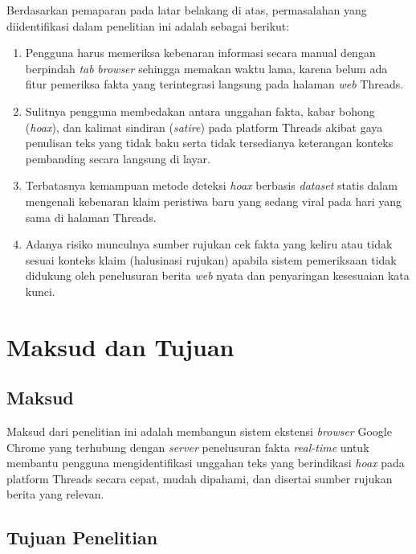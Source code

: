 \documentclass[12pt,a4paper,twoside]{report}
\begin{document}
Berdasarkan pemaparan pada latar belakang di atas, permasalahan yang diidentifikasi dalam penelitian ini adalah sebagai berikut:
\begin{enumerate}[leftmargin=0.8cm,itemsep=3pt,topsep=2pt]
  \item Pengguna harus memeriksa kebenaran informasi secara manual dengan berpindah \textit{tab} \textit{browser} sehingga memakan waktu lama, karena belum ada fitur pemeriksa fakta yang terintegrasi langsung pada halaman \textit{web} Threads.
  \item Sulitnya pengguna membedakan antara unggahan fakta, kabar bohong (\textit{hoax}), dan kalimat sindiran (\textit{satire}) pada platform Threads akibat gaya penulisan teks yang tidak baku serta tidak tersedianya keterangan konteks pembanding secara langsung di layar.
  \item Terbatasnya kemampuan metode deteksi \textit{hoax} berbasis \textit{dataset} statis dalam mengenali kebenaran klaim peristiwa baru yang sedang viral pada hari yang sama di halaman Threads.
  \item Adanya risiko munculnya sumber rujukan cek fakta yang keliru atau tidak sesuai konteks klaim (halusinasi rujukan) apabila sistem pemeriksaan tidak didukung oleh penelusuran berita \textit{web} nyata dan penyaringan kesesuaian kata kunci.
\end{enumerate}

\section{Maksud dan Tujuan}

\subsection{Maksud}

Maksud dari penelitian ini adalah membangun sistem ekstensi \textit{browser} Google Chrome yang terhubung dengan \textit{server} penelusuran fakta \textit{real-time} untuk membantu pengguna mengidentifikasi unggahan teks yang berindikasi \textit{hoax} pada platform Threads secara cepat, mudah dipahami, dan disertai sumber rujukan berita yang relevan.

\subsection{Tujuan Penelitian}
\end{document}
